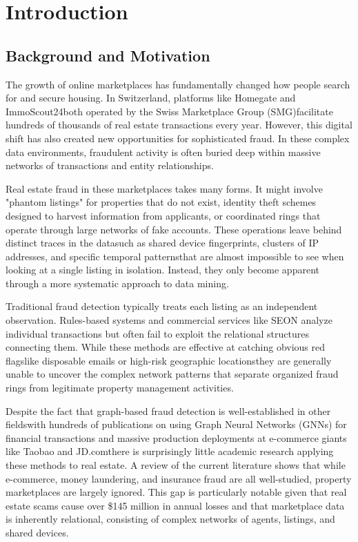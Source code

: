 \chapter{Introduction}
\label{ch:introduction}

\section{Background and Motivation}
\label{sec:1_1}

The growth of online marketplaces has fundamentally changed how people search for and secure housing. In Switzerland, platforms like Homegate and ImmoScout24both operated by the Swiss Marketplace Group (SMG)facilitate hundreds of thousands of real estate transactions every year. However, this digital shift has also created new opportunities for sophisticated fraud. In these complex data environments, fraudulent activity is often buried deep within massive networks of transactions and entity relationships.

Real estate fraud in these marketplaces takes many forms. It might involve "phantom listings" for properties that do not exist, identity theft schemes designed to harvest information from applicants, or coordinated rings that operate through large networks of fake accounts. These operations leave behind distinct traces in the datasuch as shared device fingerprints, clusters of IP addresses, and specific temporal patternsthat are almost impossible to see when looking at a single listing in isolation. Instead, they only become apparent through a more systematic approach to data mining.

Traditional fraud detection typically treats each listing as an independent observation. Rules-based systems and commercial services like SEON analyze individual transactions but often fail to exploit the relational structures connecting them. While these methods are effective at catching obvious red flagslike disposable emails or high-risk geographic locationsthey are generally unable to uncover the complex network patterns that separate organized fraud rings from legitimate property management activities.

Despite the fact that graph-based fraud detection is well-established in other fieldswith hundreds of publications on using Graph Neural Networks (GNNs) for financial transactions \cite{cheng2024gnn} and massive production deployments at e-commerce giants like Taobao and JD.comthere is surprisingly little academic research applying these methods to real estate. A review of the current literature shows that while e-commerce, money laundering, and insurance fraud are all well-studied, property marketplaces are largely ignored. This gap is particularly notable given that real estate scams cause over \$145 million in annual losses \cite{fbi2023ic3} and that marketplace data is inherently relational, consisting of complex networks of agents, listings, and shared devices.

